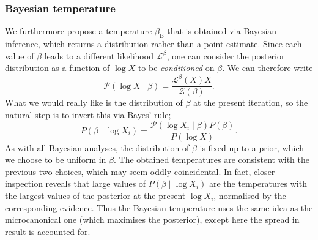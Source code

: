 \documentclass[usenatbib]{mnras}
\newcommand{\Like}{\mathcal{L}}
\begin{document}
\subsubsection{Bayesian temperature}\label{sec:bayesian_temperature}
We furthermore propose a temperature $\beta_\mathrm{B}$ that is obtained via Bayesian inference, which returns a distribution rather than a point estimate. Since each value of $\beta$ leads to a different likelihood $\Like^{\beta}$, one can consider the posterior distribution as a function of $\log X$ to be \textit{conditioned} on $\beta$. We can therefore write
\begin{equation}
   \mathcal{P}(\log X \mid \beta) = \frac{\Like^{\beta}(X) X}{\mathcal{Z(\beta)}}.
\end{equation}
What we would really like is the distribution of $\beta$ at the present iteration, so the natural step is to invert this via Bayes' rule;
\begin{equation}
    P\left(\beta \mid \log X_i\right) = \frac{\mathcal{P}\left(\log X_i \mid \beta\right) P\left(\beta\right)}{P\left(\log X\right)}.
\end{equation}
As with all Bayesian analyses, the distribution of $\beta$ is fixed up to a prior, which we choose to be uniform in $\beta$. The obtained temperatures are consistent with the previous two choices, which may seem oddly coincidental. In fact, closer inspection reveals that large values of $P(\beta \mid \log X_i)$ are the temperatures with the largest values of the posterior at the present $\log X_i$, normalised by the corresponding evidence. Thus the Bayesian temperature uses the same idea as the microcanonical one (which maximises the posterior), except here the spread in result is accounted for.
\end{document}
